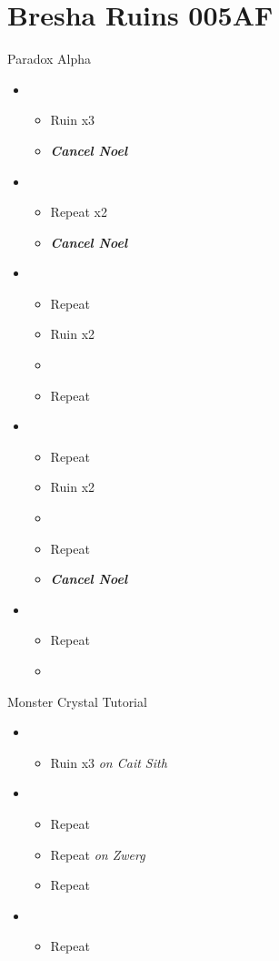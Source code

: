 \chapter{Bresha Ruins 005AF}

\begin{battle}{Paradox Alpha}
\begin{itemize}
	\item \first
	\begin{itemize}
		\item Ruin x3
		\item \textbf{\textit{Cancel Noel}}
	\end{itemize}
	\item \second
	\begin{itemize}
		\item Repeat x2
		\item \textbf{\textit{Cancel Noel}}
	\end{itemize}
	\item \first
	\begin{itemize}
		\item Repeat
		\item Ruin x2
		\item {}
		\item Repeat
	\end{itemize}
	\item \second
	\begin{itemize}
		\item Repeat
		\item Ruin x2
		\item {}
		\item Repeat
		\item \textbf{\textit{Cancel Noel}}
	\end{itemize}
	\item \first
	\begin{itemize}
		\item Repeat
		\item {}
	\end{itemize}
\end{itemize}
\end{battle}

\begin{battle}{Monster Crystal Tutorial}
\begin{itemize}
	\item \first
	\begin{itemize}
		\item Ruin x3 \textit{on Cait Sith}
	\end{itemize}
	\item \second
	\begin{itemize}
		\item Repeat
		\item Repeat \textit{on Zwerg}
		\item Repeat
	\end{itemize}
	\item \first
	\begin{itemize}
		\item Repeat
	\end{itemize}
\end{itemize}
\end{battle}

